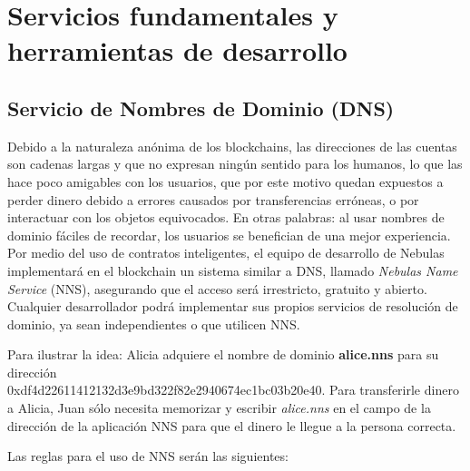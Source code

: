 \section{Servicios fundamentales y herramientas de desarrollo}
\label{sec:tools}

\subsection{Servicio de Nombres de Dominio (DNS)}

Debido a la naturaleza anónima de los blockchains, las direcciones de las cuentas son cadenas largas y que no expresan ningún sentido para los humanos, lo que las hace poco amigables con los usuarios, que por este motivo quedan expuestos a perder dinero debido a errores causados por transferencias erróneas, o por interactuar con los objetos equivocados. En otras palabras: al usar nombres de dominio fáciles de recordar, los usuarios se benefician de una mejor experiencia. Por medio del uso de contratos inteligentes, el equipo de desarrollo de Nebulas implementará en el blockchain un sistema similar a DNS, llamado \textit{Nebulas Name Service} (NNS), asegurando que el acceso será irrestricto, gratuito y abierto. Cualquier desarrollador podrá implementar sus propios servicios de resolución de dominio, ya sean independientes o que utilicen NNS.

Para ilustrar la idea: Alicia adquiere el nombre de dominio \textbf{alice.nns} para su dirección\\0xdf4d22611412132d3e9bd322f82e2940674ec1bc03b20e40. Para transferirle dinero a Alicia, Juan sólo necesita memorizar y escribir \textit{alice.nns} en el campo de la dirección de la aplicación NNS para que el dinero le llegue a la persona correcta.

Las reglas para el uso de NNS serán las siguientes:

